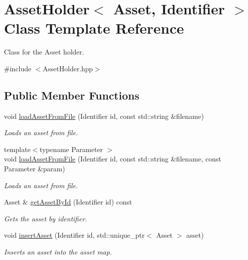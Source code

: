 \hypertarget{classAssetHolder}{}\section{Asset\+Holder$<$ Asset, Identifier $>$ Class Template Reference}
\label{classAssetHolder}


Class for the Asset holder.  




{\ttfamily \#include $<$Asset\+Holder.\+hpp$>$}

\subsection*{Public Member Functions}
\begin{DoxyCompactItemize}
\item 
void \mbox{\hyperlink{classAssetHolder_a3070fe83d5ef54d75011d2162b2d9948}{load\+Asset\+From\+File}} (Identifier id, const std\+::string \&filename)
\begin{DoxyCompactList}\small\item\em Loads an asset from file. \end{DoxyCompactList}\item 
{\footnotesize template$<$typename Parameter $>$ }\\void \mbox{\hyperlink{classAssetHolder_a4af355fb6909c492ad8a879130bd8897}{load\+Asset\+From\+File}} (Identifier id, const std\+::string \&filename, const Parameter \&param)
\begin{DoxyCompactList}\small\item\em Loads an asset from file. \end{DoxyCompactList}\item 
Asset \& \mbox{\hyperlink{classAssetHolder_abb7126c438d6f72a0eec983a98c272a9}{get\+Asset\+By\+Id}} (Identifier id) const
\begin{DoxyCompactList}\small\item\em Gets the asset by identifier. \end{DoxyCompactList}\item 
void \mbox{\hyperlink{classAssetHolder_ae7d64002db05c07fa914d5fa902a98ee}{insert\+Asset}} (Identifier id, std\+::unique\+\_\+ptr$<$ Asset $>$ asset)
\begin{DoxyCompactList}\small\item\em Inserts an asset into the asset map. \end{DoxyCompactList}\end{DoxyCompactItemize}


